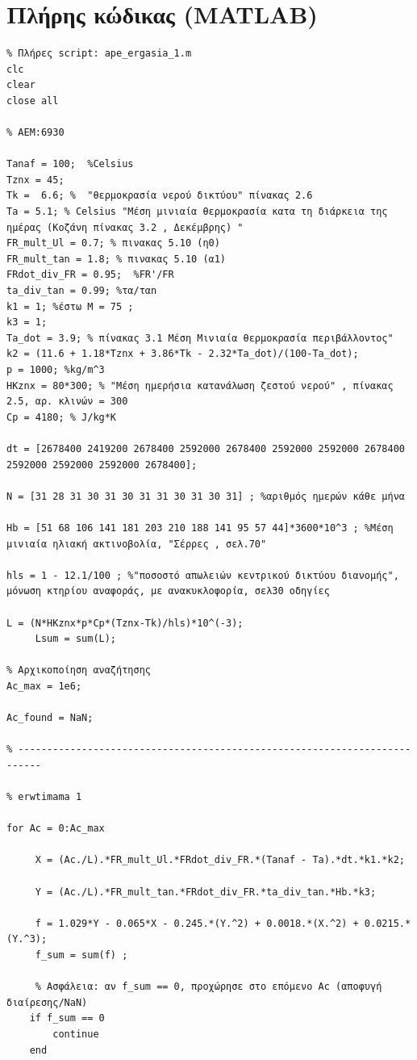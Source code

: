 \documentclass[10pt,a4paper]{article}
\begin{document}
\section{Πλήρης κώδικας (MATLAB)}
\begin{lstlisting}
% Πλήρες script: ape_ergasia_1.m
clc
clear
close all

% AEM:6930

Tanaf = 100;  %Celsius
Tznx = 45;  
Tk =  6.6; %  "θερμοκρασία νερού δικτύου" πίνακας 2.6
Ta = 5.1; % Celsius "Μέση μινιαία θερμοκρασία κατα τη διάρκεια της ημέρας (Κοζάνη πίνακας 3.2 , Δεκέμβρης) " 
FR_mult_Ul = 0.7; % πινακας 5.10 (η0)
FR_mult_tan = 1.8; % πινακας 5.10 (α1)
FRdot_div_FR = 0.95;  %FR'/FR
ta_div_tan = 0.99; %τα/ταn
k1 = 1; %έστω Μ = 75 ;
k3 = 1;
Ta_dot = 3.9; % πίνακας 3.1 Μέση Μινιαία θερμοκρασία περιβάλλοντος"
k2 = (11.6 + 1.18*Tznx + 3.86*Tk - 2.32*Ta_dot)/(100-Ta_dot);
p = 1000; %kg/m^3 
HKznx = 80*300; % "Μέση ημερήσια κατανάλωση ζεστού νερού" , πίνακας 2.5, αρ. κλινών = 300
Cp = 4180; % J/kg*K 

dt = [2678400 2419200 2678400 2592000 2678400 2592000 2592000 2678400 2592000 2592000 2592000 2678400];

N = [31 28 31 30 31 30 31 31 30 31 30 31] ; %αριθμός ημερών κάθε μήνα 

Hb = [51 68 106 141 181 203 210 188 141 95 57 44]*3600*10^3 ; %Μέση μινιαία ηλιακή ακτινοβολία, "Σέρρες , σελ.70"
 
hls = 1 - 12.1/100 ; %"ποσοστό απωλειών κεντρικού δικτύου διανομής", μόνωση κτηρίου αναφοράς, με ανακυκλοφορία, σελ30 οδηγίες

L = (N*HKznx*p*Cp*(Tznx-Tk)/hls)*10^(-3);
     Lsum = sum(L);

% Αρχικοποίηση αναζήτησης
Ac_max = 1e6;

Ac_found = NaN;

% --------------------------------------------------------------------------

% erwtimama 1

for Ac = 0:Ac_max
   
     X = (Ac./L).*FR_mult_Ul.*FRdot_div_FR.*(Tanaf - Ta).*dt.*k1.*k2;

     Y = (Ac./L).*FR_mult_tan.*FRdot_div_FR.*ta_div_tan.*Hb.*k3;

     f = 1.029*Y - 0.065*X - 0.245.*(Y.^2) + 0.0018.*(X.^2) + 0.0215.*(Y.^3);
     f_sum = sum(f) ;
     
     % Ασφάλεια: αν f_sum == 0, προχώρησε στο επόμενο Ac (αποφυγή διαίρεσης/NaN)
    if f_sum == 0
        continue
    end


\end{lstlisting}
\end{document}
